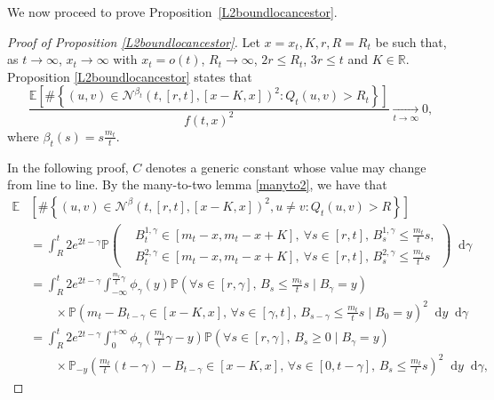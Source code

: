 \documentclass{article}
\newcommand{\E}[0]{\mathbb{E}}
\newcommand{\Prob}{\mathbb{P}}
\begin{document}
We now proceed to prove Proposition~\ref{L2boundlocancestor}.
\begin{proof}[Proof of Proposition \ref{L2boundlocancestor}]
Let $x=x_t, K, r, R=R_t$ be such that, as $t\to \infty$, \( x_t \to \infty \) with \( x_t = o(t) \), \( R_t \to \infty \), $2r\leq R_t$, $3r \leq t$ and $K\in \mathbb{R}$. Proposition \ref{L2boundlocancestor} states that 
\begin{equation}
    \frac{\E\left[\#\left\{(u,v) \in \mathcal{N}^{\beta_t}(t,[r,t],[x-K,x])^2 : Q_t(u,v) >R_t \right\}\right]}{f(t,x)^2}\xrightarrow[t\rightarrow \infty]{}0,
\end{equation}
where $\beta_t(s)=s\frac{m_t}{t}$.

In the following proof, $C$ denotes a generic constant whose value may change from line to line. By the many-to-two lemma \ref{manyto2}, we have that
\begin{equation}\label{fdfo}
    \begin{aligned}
        \E&\left[\#\left\{(u,v) \in \mathcal{N}^\beta(t,[r,t],[x-K,x])^2, u \neq v : Q_t(u,v) > R \right\}\right] \\
        &= \int_R^t 2e^{2t-\gamma} \Prob\left( 
            \begin{aligned}
                &B^{1,\gamma}_t \in [m_t-x, m_t-x+K], \ \forall s \in [r,t], \, B^{1,\gamma}_s \leq \frac{m_t}{t}s, \\
                &B^{2,\gamma}_t \in [m_t-x, m_t-x+K], \ \forall s \in [r,t], \, B^{2,\gamma}_s \leq \frac{m_t}{t}s
            \end{aligned}
        \right) \mathop{}\!\mathrm{d}\gamma \\
        &= \int_R^t 2e^{2t-\gamma} \int_{-\infty}^{\frac{m_t}{t}\gamma} \phi_\gamma(y) \Prob\left(\forall s \in [r, \gamma], \, B_s \leq \frac{m_t}{t}s \mid B_\gamma = y \right) \\
        &\qquad \times \Prob\left( m_t - B_{t-\gamma} \in [x-K,x], \, \forall s \in [\gamma,t], \, B_{s-\gamma} \leq \frac{m_t}{t}s \mid B_0 = y \right)^2 \mathop{}\!\mathrm{d}y \mathop{}\!\mathrm{d}\gamma \\
        &= \int_R^t 2e^{2t-\gamma} \int_{0}^{+\infty} \phi_\gamma\left(\frac{m_t}{t}\gamma - y\right) \Prob\left(\forall s \in [r, \gamma], \, B_s \geq 0 \mid B_\gamma = y \right) \\
        &\qquad \times \Prob_{-y}\left( \frac{m_t}{t}(t-\gamma) - B_{t-\gamma} \in [x-K,x], \, \forall s \in [0,t-\gamma], \, B_s \leq \frac{m_t}{t}s \right)^2 \mathop{}\!\mathrm{d}y \mathop{}\!\mathrm{d}\gamma,
    \end{aligned}
\end{equation}


\end{proof}
\end{document}

